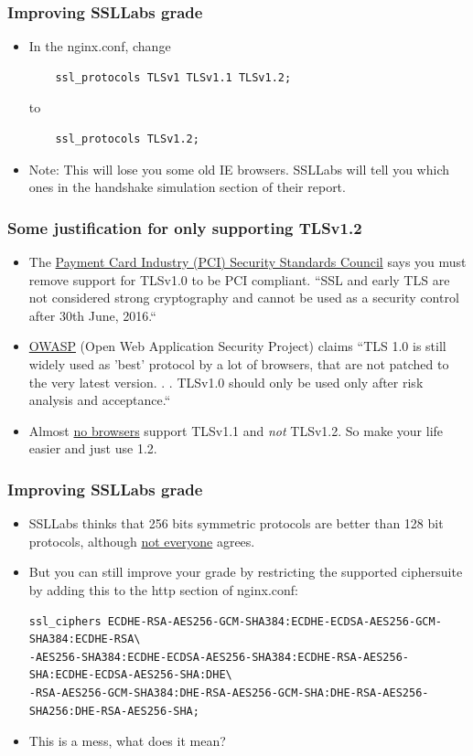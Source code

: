 \documentclass[9pt]{beamer}
\begin{document}
\begin{frame}[fragile]
\frametitle{Improving SSLLabs grade}
\begin{itemize}
\item In the nginx.conf, change 
\begin{verbatim}
    ssl_protocols TLSv1 TLSv1.1 TLSv1.2;
\end{verbatim}
to
\begin{verbatim}
    ssl_protocols TLSv1.2;
\end{verbatim}
\pause
\item Note: This will lose you some old IE browsers. SSLLabs will tell you which ones in the handshake simulation section of their report.
\end{itemize}
\end{frame}

\begin{frame}[fragile]
\frametitle{Some justification for only supporting TLSv1.2}
\begin{itemize}
\item The \href{https://www.pcisecuritystandards.org/}{Payment Card Industry (PCI) Security Standards Council} says you must remove support for TLSv1.0 to be PCI compliant. ``SSL and early TLS are not considered strong cryptography and cannot be used as a security control after 30th June, 2016.``
\pause
\item \href{https://www.owasp.org/index.php/Transport_Layer_Protection_Cheat_Sheet}{OWASP} (Open Web Application Security Project) claims ``TLS 1.0 is still widely used as 'best' protocol by a lot of browsers, that are not patched to the very latest version.  . . TLSv1.0 should only be used only after risk analysis and acceptance.``
\pause
\item Almost \href{https://en.wikipedia.org/wiki/Transport_Layer_Security\#Web_browsers}{no browsers} support TLSv1.1 and \emph{not} TLSv1.2. So make your life easier and just use 1.2.
\end{itemize}
\end{frame}

\begin{frame}[fragile]
\frametitle{Improving SSLLabs grade}
\begin{itemize}
\item SSLLabs thinks that 256 bits symmetric protocols are better than 128 bit protocols, although \href{https://www.schneier.com/blog/archives/2009/07/another_new_aes.html}{not everyone} agrees.
\pause 
\item But you can still improve your grade by restricting the supported ciphersuite by adding this to the http section of nginx.conf:
\begin{verbatim}
ssl_ciphers ECDHE-RSA-AES256-GCM-SHA384:ECDHE-ECDSA-AES256-GCM-SHA384:ECDHE-RSA\
-AES256-SHA384:ECDHE-ECDSA-AES256-SHA384:ECDHE-RSA-AES256-SHA:ECDHE-ECDSA-AES256-SHA:DHE\
-RSA-AES256-GCM-SHA384:DHE-RSA-AES256-GCM-SHA:DHE-RSA-AES256-SHA256:DHE-RSA-AES256-SHA;
\end{verbatim}
\pause
\item This is a mess, what does it mean?
\end{itemize}
\end{frame}
\end{document}
